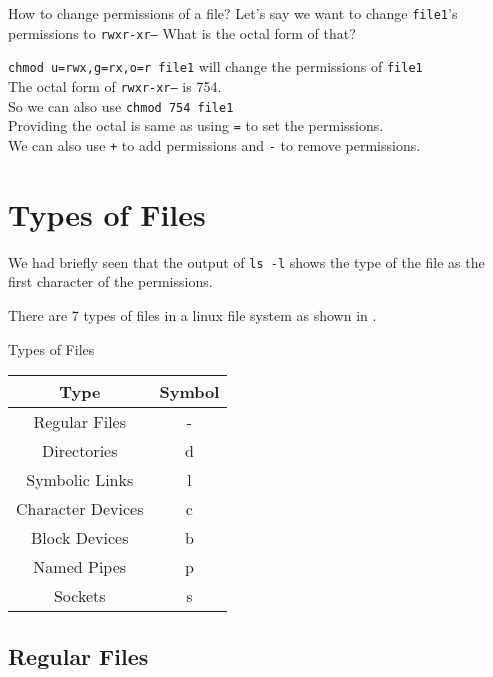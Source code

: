 \begin{qs}
  How to change permissions of a file?
  Let's say we want to change \texttt{file1}'s permissions to \texttt{rwxr-xr--}
  What is the octal form of that?
\end{qs}

\begin{ans}
  \texttt{chmod u=rwx,g=rx,o=r file1} will change the permissions of \texttt{file1}\\
  The octal form of \texttt{rwxr-xr--} is 754.\\
  So we can also use \texttt{chmod 754 file1}\\
  Providing the octal is same as using \texttt{=} to set the permissions.\\
  We can also use \texttt{+} to add permissions and \texttt{-} to remove permissions.
\end{ans}


\vfill
\pagebreak
\section{Types of Files}

We had briefly seen that the output of \texttt{ls -l} shows the type of the file as the first character of the permissions.

There are 7 types of files in a linux file system as shown in .

\begin{margintable}
\caption{Types of Files}
\begin{tabular}{ c c }
  \toprule
  Type & Symbol \\
 \midrule
  Regular Files & -{} \\
  Directories & d \\
  Symbolic Links & l \\
  Character Devices & c \\
  Block Devices & b \\
  Named Pipes & p \\
  Sockets & s \\
 \bottomrule
\end{tabular}
\end{margintable}

\subsection{Regular Files}

